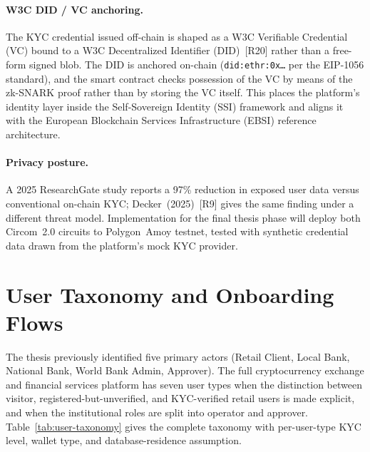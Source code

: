 \documentclass[12pt,a4paper]{report}
\begin{document}
\paragraph{W3C DID / VC anchoring.}
The KYC credential issued off-chain is shaped as a W3C Verifiable Credential (VC) bound to a W3C Decentralized Identifier (DID)~[R20] rather than a free-form signed blob. The DID is anchored on-chain (\texttt{did:ethr:0x\ldots} per the EIP-1056 standard), and the smart contract checks possession of the VC by means of the zk-SNARK proof rather than by storing the VC itself. This places the platform's identity layer inside the Self-Sovereign Identity (SSI) framework and aligns it with the European Blockchain Services Infrastructure (EBSI) reference architecture.

\paragraph{Privacy posture.}
A 2025 ResearchGate study reports a 97\% reduction in exposed user data versus conventional on-chain KYC; Decker~(2025)~[R9] gives the same finding under a different threat model. Implementation for the final thesis phase will deploy both Circom~2.0 circuits to Polygon~Amoy testnet, tested with synthetic credential data drawn from the platform's mock KYC provider.

\section{User Taxonomy and Onboarding Flows}
\label{sec:onboarding}

The thesis previously identified five primary actors (Retail Client, Local Bank, National Bank, World Bank Admin, Approver). The full cryptocurrency exchange and financial services platform has seven user types when the distinction between visitor, registered-but-unverified, and KYC-verified retail users is made explicit, and when the institutional roles are split into operator and approver. Table~\ref{tab:user-taxonomy} gives the complete taxonomy with per-user-type KYC level, wallet type, and database-residence assumption.
\end{document}
